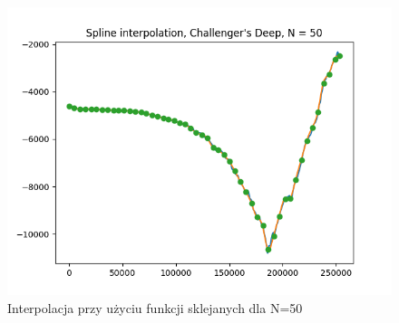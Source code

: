 \documentclass{article}
\begin{document}
\begin{itemize}
\begin{figure}[!htb]
    \endminipage\hfill
      \includegraphics[width=\linewidth]{Challenger's_Deep_splines_N_50.png}
      \caption{Interpolacja przy użyciu funkcji sklejanych dla N=50}
    \endminipage\hfill
    \end{figure}
    

\end{itemize}
\end{document}
